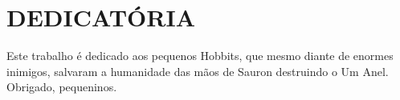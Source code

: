 \section*{DEDICATÓRIA}

Este trabalho é dedicado aos pequenos Hobbits, que mesmo diante de enormes inimigos, salvaram a humanidade das mãos de Sauron destruindo o Um Anel. Obrigado, pequeninos.

\pagebreak

